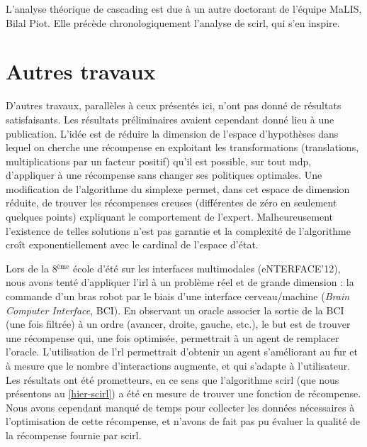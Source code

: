 \documentclass[frenchb,a4paper,justified,notoc]{tufte-book}
\begin{document}
L'analyse théorique de \gls{cascading} est due à un autre doctorant de l'équipe MaLIS, Bilal Piot. Elle précède chronologiquement l'analyse de \gls{scirl}, qui s'en inspire.
\section{Autres travaux}
\label{sec-10-4}
\label{hier-autrestravaux}

D'autres travaux, parallèles à ceux présentés ici, n'ont pas donné de résultats satisfaisants. Les résultats préliminaires avaient cependant donné lieu à une publication. L'idée est de réduire la dimension de l'espace d'hypothèses dans lequel on cherche une récompense en exploitant les transformations (translations, multiplications par un facteur positif) qu'il est possible, sur tout \gls{mdp}, d'appliquer à une récompense sans changer ses politiques optimales. Une modification de l'algorithme du simplexe permet, dans cet espace de dimension réduite, de trouver les récompenses creuses (différentes de zéro en seulement quelques points) expliquant le comportement de l'expert. Malheureusement l'existence de telles solutions n'est pas garantie et la complexité de l'algorithme croît exponentiellement avec le cardinal de l'espace d'état. \\

Lors de la 8$^{\textrm{ème}}$ école d'été sur les interfaces multimodales (eNTERFACE'12), nous avons tenté d'appliquer l'\gls{irl} à un problème réel et de grande dimension : la commande d'un bras robot par le biais d'une interface cerveau/machine (\emph{Brain Computer Interface}, BCI). En observant un oracle associer la sortie de la BCI (une fois filtrée) à un ordre (avancer, droite, gauche, etc.), le but est de trouver une récompense qui, une fois optimisée, permettrait à un agent de remplacer l'oracle. L'utilisation de l'\gls{rl} permettrait d'obtenir un agent s'améliorant au fur et à mesure que le nombre d'interactions augmente, et qui s'adapte à l'utilisateur. Les résultats ont été prometteurs, en ce sens que l'algorithme \gls{scirl} (que nous présentons au \autoref{hier-scirl}) a été en mesure de trouver une fonction de récompense. Nous avons cependant manqué de temps pour collecter les données nécessaires à l'optimisation de cette récompense, et n'avons de fait pas pu évaluer la qualité de la récompense fournie par \gls{scirl}.\\

\begin{fullwidth}
\printbibliography
\end{fullwidth}
\end{document}
